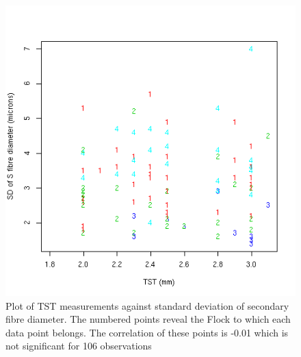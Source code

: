 %

\begin{figure}[!h]
  \centering
  \includegraphics[width=1.0\textwidth]{tstdssd.png}
  \caption{Plot of TST measurements against standard deviation of secondary fibre diameter. The numbered points reveal the Flock to which each data point belongs. The correlation of these points is -0.01 which is not significant for 106 observations}
  \label{fig:tstdssd}
\end{figure}

%

